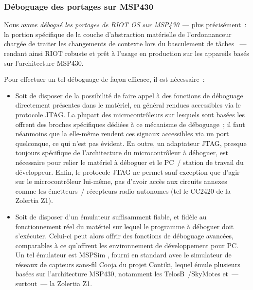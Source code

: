 \subsubsection{Déboguage des portages sur MSP430}
\label{ParRIOTDebugMSP430}

Nous avons \emph{débogué les portages de RIOT OS sur MSP430}~--- plus
précisément~: la portion spécifique de la couche d'abstraction matérielle
de l'ordonnanceur chargée de traiter les changements de contexte
lors du basculement de tâches \cite{PRriotFix2MSP430}
\cite{PRriotFix3MSP430} \cite{PRriotFix1MSP430}~--- rendant ainsi RIOT
robuste et prêt à l'usage en production sur les appareils basés sur
l'architecture MSP430.

\smallskip

Pour effectuer un tel déboguage de façon efficace, il est nécessaire~:

\begin{itemize} 

\item Soit de disposer de la possibilité de faire appel à des fonctions
de déboguage directement présentes dans le matériel, en général rendues
accessibles via le protocole JTAG. La plupart des microcontrôleurs
sur lesquels sont basées les  offrent des broches spécifiques
dédiées à ce mécanisme de déboguage~; il faut néanmoins que la 
elle-même rendent ces signaux accessibles via un port quelconque, ce qui
n'est pas évident. En outre, un adaptateur JTAG, presque toujours spécifique
de l'architecture du microcontrôleur à déboguer, est nécessaire pour relier
le matériel à déboguer et le PC~/ station de travail du développeur.
Enfin, le protocole JTAG ne permet sauf exception que d'agir sur le
microcontrôleur lui-même, pas d'avoir accès aux circuits annexes comme
les émetteurs~/ récepteurs radio autonomes (tel le CC2420 de la Zolertia
Z1).

\item Soit de disposer d'un émulateur suffisamment fiable, et fidèle au
fonctionnement réel du matériel sur lequel le programme à déboguer doit
s'exécuter. Celui-ci peut alors offrir des fonctions de déboguage avancées,
comparables à ce qu'offrent les environnement de développement pour PC.
Un tel émulateur est MSPSim \cite{MSPSim}, fourni en standard avec le
simulateur de réseaux de capteurs sans-fil Cooja \cite{Cooja} du projet
Contiki, lequel émule plusieurs  basées sur l'architecture
MSP430, notamment les TelosB~/SkyMotes et~--- surtout~--- la Zolertia Z1.

\end{itemize}

